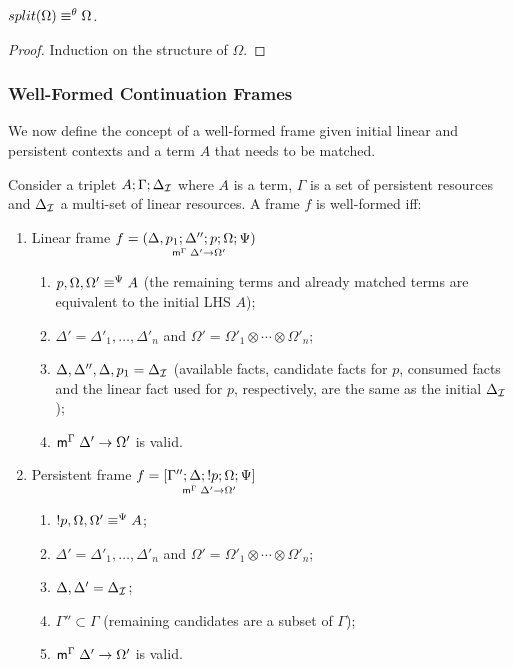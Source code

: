 \begin{theorem}
$\feqa{split(\Omega)}{\Omega}{\theta}{\theta}$.
\end{theorem}
\begin{proof}
Induction on the structure of $\Omega$.
\end{proof}

\subsubsection{Well-Formed Continuation Frames}

We now define the concept of a well-formed frame given initial linear and
persistent contexts and a term $A$ that needs to be matched.

\begin{definition}

Consider a triplet $A; \Gamma; \deltan$ where $A$ is a term, $\Gamma$ is a
set of persistent resources and $\deltan$ a multi-set of linear
resources. A frame $f$ is well-formed iff:

\begin{enumerate}[leftmargin=*]
   \item Linear frame $f = \lframe{\Delta,
      p_1}{\Delta''}{p}{\Omega; \Psi}{\Delta'}{\Omega'}$

   \begin{enumerate}
      \item $\feqa{p, \Omega, \Omega'}{A}{\Psi}{\Psi}$ (the remaining terms and already
               matched terms are equivalent to the initial LHS $A$);
      \item $\Delta' = \Delta'_1, \dotsc, \Delta'_n$ and $\Omega' = \Omega'_1 \otimes \dotsb \otimes \Omega'_n$;
      \item $\Delta, \Delta'', \Delta, p_1 = \deltan$ (available facts, candidate
            facts for $p$, consumed facts and the linear fact used for $p$,
            respectively, are the same as the initial $\deltan$);
      \item $\mz{\Gamma}{\Delta'}{\Omega'}$ is valid.

   \end{enumerate}
   \item Persistent frame $f = \pframe{\Gamma''}{\Delta}{\bang p}{\Omega; \Psi}{\Delta'}{\Omega'}$

   \begin{enumerate}
      \item $\feqa{\bang p, \Omega, \Omega'}{A}{\Psi}{\Psi}$;
      \item $\Delta' = \Delta'_1, \dotsc, \Delta'_n$ and $\Omega' =
      \Omega'_1 \otimes \dotsb \otimes \Omega'_n$;
      \item $\Delta, \Delta' = \deltan$;
      \item $\Gamma'' \subset \Gamma$ (remaining candidates are a subset of
                  $\Gamma$);
      \item $\mz{\Gamma}{\Delta'}{\Omega'}$ is valid.
   \end{enumerate}
\end{enumerate}
\end{definition}

